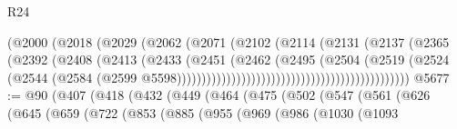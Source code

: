 \begin{lexlean}{R24}
\begin{coremodule}
                                                    (@2000
                                                      (@2018
                                                        (@2029
                                                          (@2062
                                                            (@2071
                                                              (@2102
                                                                (@2114
                                                                  (@2131
                                                                    (@2137
                                                                      (@2365
                                                                        (@2392
                                                                          (@2408
                                                                            (@2413
                                                                              (@2433
                                                                                (@2451
                                                                                  (@2462
                                                                                    (@2495
                                                                                      (@2504
                                                                                        (@2519
                                                                                          (@2524
                                                                                            (@2544
                                                                                              (@2584
                                                                                                (@2599
                                                                                                  @5598)))))))))))))))))))))))))))))))))))))))))))))))
@5677 := @90
    (@407
      (@418
        (@432
          (@449
            (@464
              (@475
                (@502
                  (@547
                    (@561
                      (@626
                        (@645
                          (@659
                            (@722
                              (@853
                                (@885
                                  (@955
                                    (@969
                                      (@986
                                        (@1030
                                          (@1093

\end{coremodule}
\end{lexlean}

